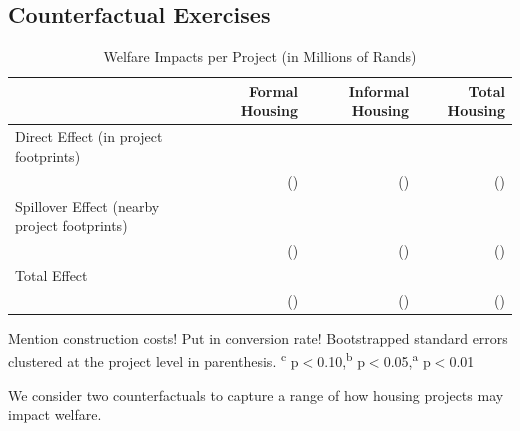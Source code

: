 \documentclass[12pt]{article}
\begin{document}
\subsection{Counterfactual Exercises}

\begin{table}[h]
\centering
\caption{Welfare Impacts per Project (in Millions of Rands)}\label{table:welfare}
\vspace{-2mm}
\begin{threeparttable}
\begin{tabular}{lDDD}
\toprule
  &    Formal Housing  &  Informal Housing & Total Housing \\ \midrule 
Direct Effect (in project footprints) &   &  &  \\
 & (\unskip) & (\unskip) & (\unskip) \\[.5em]
Spillover Effect (nearby project footprints) &   &  &  \\
 & (\unskip) & (\unskip) & (\unskip) \\[.5em]
Total Effect &  &  &  \\
&  (\unskip) & (\unskip) & (\unskip) \\[.5em]
\bottomrule
\end{tabular}
\begin{tablenotes}
\item \footnotesize Mention construction costs! Put in conversion rate!  Bootstrapped standard errors clustered at the project level in parenthesis. \textsuperscript{c} p$<$0.10,\textsuperscript{b} p$<$0.05,\textsuperscript{a} p$<$0.01 \,\,  
\end{tablenotes}
\end{threeparttable}
\end{table}


We consider two counterfactuals to capture a range of how housing projects may impact welfare.  
\end{document}
